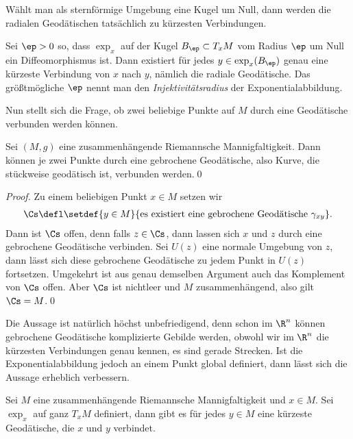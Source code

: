 \documentclass[%
	paper=a5,%
	fleqn,%
	DIV=18,%
	BCOR=0mm,
	fontsize=11pt,
	titlepage=false,%
	bibliography=totoc,
	DIV=18,%
	twoside=true,
	pdftitle=Riemannsche Geometrie,
	pdfauthor=Uwe Semmelmann,
	numbers=noendperiod]%
	{scrbook}
\begin{document}
Wählt man als sternförmige Umgebung eine Kugel um Null, dann werden die radialen Geodätischen tatsächlich zu kürzesten Verbindungen.

\begin{prop}
Sei $\ep > 0$ so, dass $\exp_{x}$ auf der Kugel $B_{\ep}\subset T_{x}M$ vom Radius $\ep$ um Null ein Diffeomorphismus ist. Dann existiert für jedes $y\in \exp_{x}(B_{\ep})$ genau eine kürzeste Verbindung von $x$ nach $y$, nämlich die radiale Geodätische. 
Das größtmögliche $\ep$ nennt man den \emph{Injektivitätsradius} der Exponentialabbildung.\fish
\end{prop}


Nun stellt sich die Frage, ob zwei beliebige Punkte auf $M$ durch eine Geodätische verbunden werden können.

\begin{prop}
Sei $(M,g)$ eine zusammenhängende Riemannsche Mannigfaltigkeit. Dann können je zwei Punkte durch eine gebrochene Geodätische, also Kurve, die stückweise geodätisch ist, verbunden werden.\qed
\end{prop}
\begin{proof}
Zu einem beliebigen Punkt $x\in M$ setzen wir
\begin{align*}
\Cs \defl \setdef{y\in M}{\text{es existiert eine gebrochene Geodätische }\gamma_{{xy}}}.
\end{align*}
Dann ist $\Cs$ offen, denn falls $z\in \Cs$, dann lassen sich $x$ und $z$ durch eine gebrochene Geodätische verbinden. Sei $U(z)$ eine normale Umgebung von $z$, dann lässt sich diese gebrochene Geodätische zu jedem Punkt in $U(z)$ fortsetzen.
Umgekehrt ist aus genau demselben Argument auch das Komplement von $\Cs$ offen. Aber $\Cs$ ist nichtleer und $M$ zusammenhängend, also gilt $\Cs = M$.\qed
\end{proof}

Die Aussage ist natürlich höchst unbefriedigend, denn schon im $\R^n$ können gebrochene Geodätische komplizierte Gebilde werden, obwohl wir im $\R^n$ die kürzesten Verbindungen genau kennen, es sind gerade Strecken. Ist die Exponentialabbildung jedoch an einem Punkt global definiert, dann lässt sich die Aussage erheblich verbessern.

\begin{prop}
Sei $M$ eine zusammenhängende Riemannsche Mannigfaltigkeit und $x\in M$. Sei $\exp_{x}$ auf ganz $T_{x}M$ definiert, dann gibt es für jedes $y\in M$ eine kürzeste Geodätische, die $x$ und $y$ verbindet.\fish
\end{prop}
\end{document}
